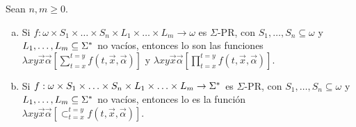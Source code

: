   \begin{lemma}
    \par Sean $n, m \geq 0$.

    \begin{enumerate}[a)]
      \item Si $f: \omega \times S_{1} \times \dotsc \times S_{n} \times L_{1} \times \dotsc \times L_{m} \rightarrow
        \omega$ es $\Sigma$-PR, con $ S_{1}, \dotsc, S_{n} \subseteq \omega$ y $L_{1}, \dotsc, L_{m} \subseteq \Sigma^{\ast}$
        no vacíos, entonces lo son las funciones $\lambda xy\vec{x}\vec{\alpha} \left[\sum_{t=x}^{t=y} f(t, \vec{x},
        \vec{\alpha})\right]$ y $\lambda xy\vec{x}\vec{\alpha} \left[\prod_{t=x}^{t=y}f(t, \vec{x}, \vec{\alpha})
        \right]$.
      \item Si $f: \omega \times S_{1} \times \dotsc \times S_{n} \times L_{1} \times \dotsc \times L_{m} \rightarrow
        \Sigma^{\ast}$ es $\Sigma$-PR, con $ S_{1}, \dotsc, S_{n} \subseteq \omega$ y $L_{1}, \dotsc, L_{m} \subseteq \Sigma^{\ast}$
        no vacíos, entonces lo es la función $\lambda xy\vec{x}\vec{\alpha}\left[\subset_{t=x}^{t=y} f(t, \vec{x},
        \vec{\alpha})\right]$.
    \end{enumerate}
  \end{lemma}
